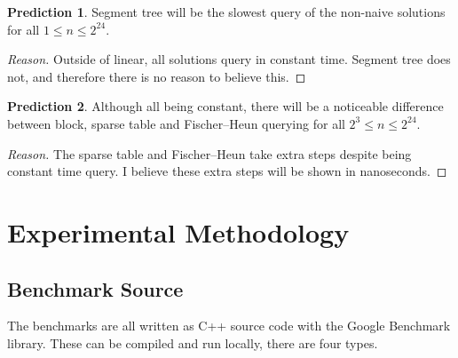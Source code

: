 \documentclass{article}
\theoremstyle{definition}
\newtheorem{prediction}{Prediction}
\begin{document}
\begin{prediction}\label{pred:best}
Segment tree will be the slowest query of the non-naive solutions for all $1 \le n \le 2^{24}$.
\end{prediction}
\begin{proof}[Reason]
Outside of linear, all solutions query in constant time.  Segment tree does not, and therefore there is no reason to believe this.
\end{proof}

\begin{prediction}\label{pred:best}
Although all being constant, there will be a noticeable difference between block, sparse table and Fischer--Heun querying for all $2^3 \le n \le 2^{24}$.
\end{prediction}
\begin{proof}[Reason]
The sparse table and Fischer--Heun take extra steps despite being constant time query.  I believe these extra steps will be shown in nanoseconds.
\end{proof}

\section{Experimental Methodology}
\subsection{Benchmark Source}
The benchmarks are all written as C++ source code with the Google Benchmark library.  These can be compiled and run locally, there are four types.
\end{document}
